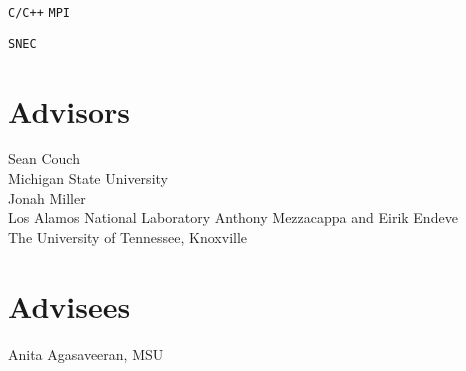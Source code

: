 \documentclass[letterpaper]{deedy-resume} %
\begin{document}
\begin{minipage}[t]{0.36\textwidth}

\texttt{C/C++} \textbullet{} \FORTRAN \textbullet{} \Python \textbullet{} \Julia \textbullet{} \Kokkos \textbullet{} \texttt{MPI}

\sectionspace %


\phoebus \textbullet{} \FLASH \textbullet{} \thornado \textbullet{} \texttt{SNEC}
\sectionspace %


\section{Advisors}
Sean Couch \\
Michigan State University \\
Jonah Miller \\
Los Alamos National Laboratory
Anthony Mezzacappa and Eirik Endeve\\
The University of Tennessee, Knoxville

\section{Advisees}
Anita Agasaveeran, MSU

\sectionspace %


\end{minipage} %
\hfill
%
%
\end{document}
